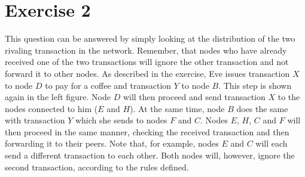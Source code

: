 \documentclass[12pt]{article}
\begin{document}
	\newpage
	\section*{Exercise 2}
	
	This question can be answered by simply looking at the distribution of the two rivaling transaction in the network. Remember, that nodes who have already received one of the two transactions will ignore the other transaction and not forward it to other nodes. As described in the exercise, Eve issues transaction $X$ to node $D$ to pay for a coffee and transaction $Y$ to node $B$. This step is shown again in the left figure. Node $D$ will then proceed and send transaction $X$ to the nodes connected to him ($E$ and $H$). At the same time, node $B$ does the same with transaction $Y$ which she sends to nodes $F$ and $C$. Nodes $E$, $H$, $C$ and $F$ will then proceed in the same manner, checking the received transaction and then forwarding it to their peers. Note that, for example, nodes $E$ and $C$ will each send a different transaction to each other. Both nodes will, however, ignore the second transaction, according to the rules defined.
	
\end{document}
